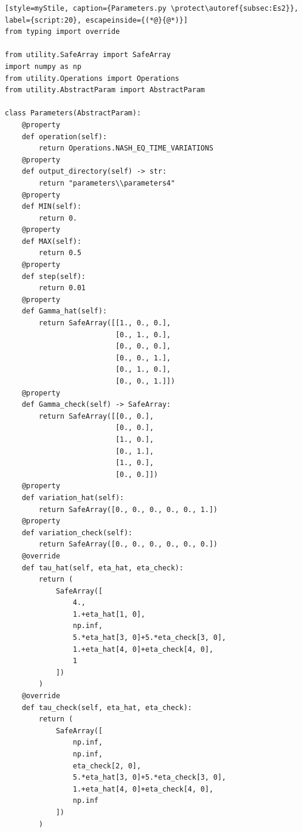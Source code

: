 \begin{lstlisting}[style=myStile, caption={Parameters.py \protect\autoref{subsec:Es2}}, label={script:20}, escapeinside={(*@}{@*)}]
from typing import override

from utility.SafeArray import SafeArray
import numpy as np
from utility.Operations import Operations
from utility.AbstractParam import AbstractParam

class Parameters(AbstractParam):
    @property
    def operation(self):
        return Operations.NASH_EQ_TIME_VARIATIONS 
    @property
    def output_directory(self) -> str:
        return "parameters\\parameters4"
    @property 
    def MIN(self):
        return 0.
    @property
    def MAX(self):
        return 0.5
    @property
    def step(self):
        return 0.01
    @property
    def Gamma_hat(self):
        return SafeArray([[1., 0., 0.],
                          [0., 1., 0.],
                          [0., 0., 0.],
                          [0., 0., 1.],
                          [0., 1., 0.],
                          [0., 0., 1.]])    
    @property
    def Gamma_check(self) -> SafeArray:
        return SafeArray([[0., 0.],
                          [0., 0.],
                          [1., 0.],
                          [0., 1.],
                          [1., 0.],
                          [0., 0.]])
    @property
    def variation_hat(self):
        return SafeArray([0., 0., 0., 0., 0., 1.]) 
    @property
    def variation_check(self):
        return SafeArray([0., 0., 0., 0., 0., 0.])
    @override
    def tau_hat(self, eta_hat, eta_check):
        return (
            SafeArray([
                4.,
                1.+eta_hat[1, 0],
                np.inf,
                5.*eta_hat[3, 0]+5.*eta_check[3, 0],
                1.+eta_hat[4, 0]+eta_check[4, 0],
                1
            ])
        )
    @override
    def tau_check(self, eta_hat, eta_check):
        return (
            SafeArray([
                np.inf,
                np.inf,
                eta_check[2, 0],
                5.*eta_hat[3, 0]+5.*eta_check[3, 0],
                1.+eta_hat[4, 0]+eta_check[4, 0],
                np.inf
            ])
        )
\end{lstlisting}

